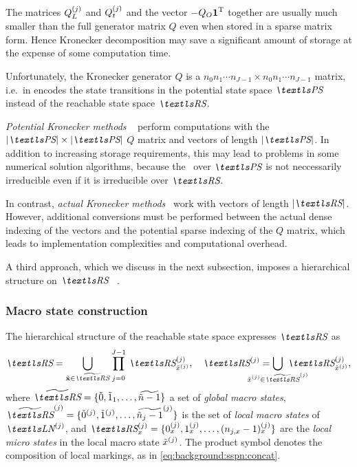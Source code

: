 The matrices $Q_L^{(j)}$ and $Q_t^{(j)}$ and the vector
$-Q_O \bm{\mathrm{1}}^{\mathrm{T}}$ together are usually much smaller than the full
generator matrix $Q$ even when stored in a sparse matrix form. Hence
Kronecker decomposition may save a significant amount of storage at
the expense of some computation time.

Unfortunately, the Kronecker generator $Q$ is a
$n_0 n_1 \cdots n_{J - 1} \times n_0 n_1 \cdots n_{J - 1}$ matrix,
i.e.~in encodes the state transitions in the potential state space
$\PS$ instead of the reachable state space $\RS$.

\emph{Potential Kronecker methods}%
~\citep{DBLP:journals/informs/BuchholzCDK00} perform computations with
the $\lvert \PS \rvert \times \lvert \PS \rvert$ $Q$ matrix and
vectors of length $\lvert \PS \rvert$. In addition to increasing
storage requirements, this may lead to problems in some numerical
solution algorithms, because the \CTMC\ over $\PS$ is not neccessarily
irreducible even if it is irreducible over $\RS$.

In contrast, \emph{actual Kronecker methods}~%
\citep{DBLP:journals/tse/Kemper96,%
  DBLP:journals/informs/BuchholzCDK00,%
  DBLP:journals/fgcs/BenoitPS06} work with vectors of length
$\lvert \RS \rvert$. However, additional conversions must be performed
between the actual dense indexing of the vectors and the potential
sparse indexing of the $Q$ matrix, which leads to implementation
complexities and computational overhead.

A third approach, which we discuss in the next subsection, imposes a
hierarchical structure on $\RS$~%
\citep{DBLP:conf/cpe/BauseBK98,%
  DBLP:journals/sigmetrics/BuchholzK98,%
  DBLP:journals/tse/Buchholz99}.

\subsubsection{Macro state construction}

The hierarchical structure of the reachable state space expresses
$\RS$ as
\begin{equation}
  \RS = \bigcup_{\macro{\vec{x}} \in \Macro{\RS}}
  \prod_{\vphantom{\Macro{\RS}}j = 0}^{J - 1}
  \, \loc{\RS}{j}_{\loc{\macro{x}}{j}}, \quad
  \loc{\RS}{j} = \bigcup_{\mathclap{\loc{\macro{x}}{j} \in \loc{\Macro{\RS}}{j}}}
  \,\, \loc{\RS}{j}_{\loc{\macro{x}}{j}} \text,
\end{equation}
where
$\Macro{\RS} = \{\macro{0}, \macro{1}_1, \ldots, \Macro{\macro{n} - 1}
\}$
a set of \emph{global macro states},
$\loc{\Macro{\RS}}{j} = \{\loc{\macro{0}}{j}, \loc{\macro{1}}{j},
\ldots, \loc{\Macro{\macro{n}_j - 1}}{j} \}$ is the set of \emph{local
macro states} of $\LN{j}$, and $\loc{\RS}{j}_{x} = \{\loc{0}{j}_x,
\loc{1}{j}_x, \ldots, \loc{(n_{j, x} - 1)}{j}_x \}$ are the
\emph{local micro states} in the local macro state
$\tilde{x}^{(j)}$. The product symbol denotes the composition of
local markings, as in \vref{eq:background:sspn:concat}.


